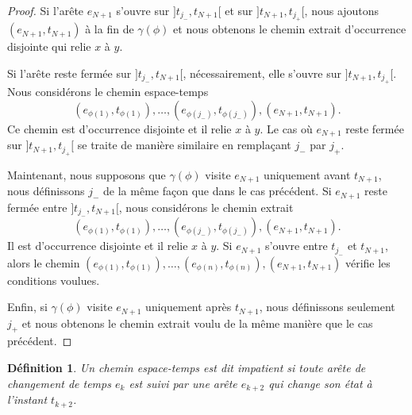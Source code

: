\documentclass[titlepage,a4paper,12pt]{article}
\newcounter{d}
\newcounter{t}
\newcounter{p}
\newcounter{c}
\newcounter{a}
\newcounter{l}
\newtheorem{defi}[d]{Définition}
\begin{document}
\begin{proof}
Si l'arête $e_{N+1}$ s'ouvre sur $]t_{j_-},t_{N+1}[$ et sur $]t_{N+1},t_{j_+}[$, nous ajoutons $(e_{N+1},t_{N+1})$ à la fin de $\gamma(\phi)$ et nous obtenons le chemin extrait d'occurrence disjointe qui relie $x$ à $y$.

Si l'arête reste fermée sur $]t_{j_-},t_{N+1}[$, nécessairement, elle s'ouvre sur $]t_{N+1},t_{j_+}[$. Nous considérons le chemin espace-temps 
$$(e_{\phi(1)},t_{\phi(1)}), \dots, (e_{\phi(j_-)},t_{\phi(j_-)}),(e_{N+1},t_{N+1}).
$$
Ce chemin est d'occurrence disjointe et il relie $x$ à $y$.
Le cas où $e_{N+1}$ reste fermée sur $]t_{N+1},t_{j_+}[$ se traite de manière similaire en remplaçant $j_-$ par $j_+$.

Maintenant, nous supposons que $\gamma(\phi)$ visite $e_{N+1}$ uniquement avant $t_{N+1}$, nous définissons $j_-$ de la même façon que dans le cas précédent. Si $e_{N+1}$ reste fermée entre $]t_{j_-}, t_{N+1}[$, nous considérons le chemin extrait $$(e_{\phi(1)},t_{\phi(1)}),\dots, (e_{\phi(j_-)},t_{\phi(j_-)}),(e_{N+1},t_{N+1}).$$ Il est d'occurrence disjointe et il relie $x$ à $y$. Si $e_{N+1}$ s'ouvre entre $t_{j_-}$ et $t_{N+1}$, alors le chemin $(e_{\phi(1)},t_{\phi(1)}),\dots, (e_{\phi(n)},t_{\phi(n)}),(e_{N+1},t_{N+1})$ vérifie les conditions voulues.

Enfin, si $\gamma(\phi)$ visite $e_{N+1}$ uniquement après $t_{N+1}$, nous définissons seulement $j_+$ et nous obtenons le chemin extrait voulu de la même manière que le cas précédent.
\end{proof}

\begin{defi}
Un chemin espace-temps est dit impatient si toute arête de changement de temps $e_k$ est suivi par une arête $e_{k+2}$ qui change son état à l'instant $t_{k+2}$.
\end{defi}
\end{document}

